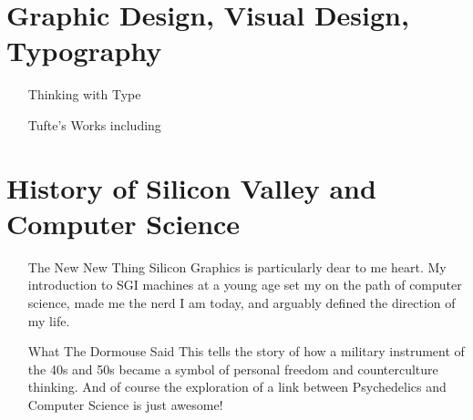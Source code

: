 \section{Graphic Design, Visual Design, Typography}

\begin{itemize}

\item[Thinking with Type]

\item[Tufte's Works] including 

\end{itemize}

\section{History of Silicon Valley and Computer Science}

\begin{itemize}

\item[The New New Thing] Silicon Graphics is particularly dear to me heart. My introduction to SGI machines at a young age set my on the path of computer science, made me the nerd I am today, and arguably defined the direction of my life.

\item[What The Dormouse Said] This tells the story of how a military instrument of the 40s and 50s became a symbol of personal freedom and counterculture thinking. And of course the exploration of a link between Psychedelics and Computer Science is just awesome!

\end{itemize}
